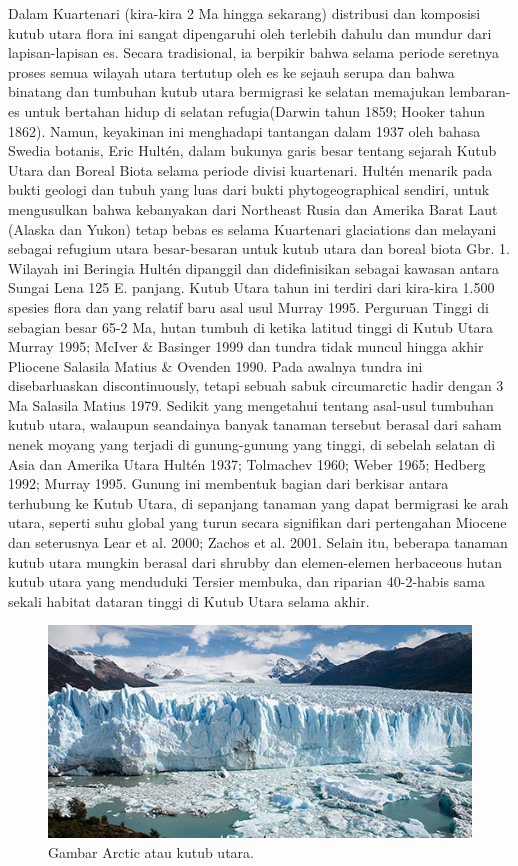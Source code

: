 		Dalam Kuartenari (kira-kira 2 Ma hingga sekarang) distribusi dan komposisi kutub utara flora ini sangat dipengaruhi oleh terlebih dahulu dan mundur dari 
	lapisan-lapisan es. Secara tradisional, ia berpikir bahwa selama periode seretnya proses semua wilayah utara tertutup oleh es ke sejauh serupa dan bahwa
	binatang dan tumbuhan kutub utara bermigrasi ke selatan memajukan lembaran-es untuk bertahan hidup di selatan refugia(Darwin tahun 1859; Hooker tahun 1862).
	Namun, keyakinan ini menghadapi tantangan dalam 1937 oleh bahasa Swedia botanis, Eric Hultén, dalam bukunya garis besar tentang sejarah Kutub Utara dan 
	Boreal Biota selama periode divisi kuartenari. Hultén menarik pada bukti geologi dan tubuh yang luas dari bukti phytogeographical sendiri, untuk mengusulkan
	bahwa kebanyakan dari Northeast Rusia dan Amerika Barat Laut (Alaska dan Yukon) tetap bebas es selama Kuartenari glaciations dan melayani sebagai refugium 
	utara besar-besaran untuk kutub utara dan boreal biota {Gbr. 1}. Wilayah ini Beringia Hultén dipanggil dan didefinisikan sebagai kawasan antara Sungai Lena 
	{125 E. panjang.}
		Kutub Utara tahun ini terdiri dari kira-kira 1.500 spesies flora dan yang relatif baru asal usul {Murray 1995}. Perguruan Tinggi di sebagian besar {65-2 Ma}, 
	hutan tumbuh di ketika latitud tinggi di Kutub Utara {Murray 1995; McIver \& Basinger 1999} dan tundra tidak muncul hingga akhir Pliocene {Salasila Matius \& Ovenden 1990}.
	Pada awalnya tundra ini disebarluaskan discontinuously, tetapi sebuah sabuk circumarctic hadir dengan 3 Ma {Salasila Matius 1979}. 
	Sedikit yang mengetahui tentang asal-usul tumbuhan kutub utara, walaupun seandainya banyak tanaman tersebut berasal dari saham nenek moyang yang terjadi di gunung-gunung yang tinggi, di sebelah selatan di Asia dan Amerika Utara {Hultén 1937; Tolmachev 1960; Weber 1965; Hedberg 1992; Murray 1995}. Gunung ini membentuk 
	bagian dari berkisar antara terhubung ke Kutub Utara, di sepanjang tanaman yang dapat bermigrasi ke arah utara, seperti suhu global yang turun secara signifikan dari 
	pertengahan Miocene dan seterusnya {Lear et al. 2000; Zachos et al. 2001}. Selain itu, beberapa tanaman kutub utara mungkin berasal dari shrubby dan elemen-elemen 
	herbaceous hutan kutub utara yang menduduki Tersier membuka, dan riparian {40-2}-habis sama sekali habitat dataran tinggi di Kutub Utara selama akhir.
	
\begin{figure}[ht]
\centerline{\includegraphics[width=.5\textwidth]{figures/arctic.jpg}}
\caption{Gambar Arctic atau kutub utara.}	
\label{Kutub_Utara}
\end{figure}
	
